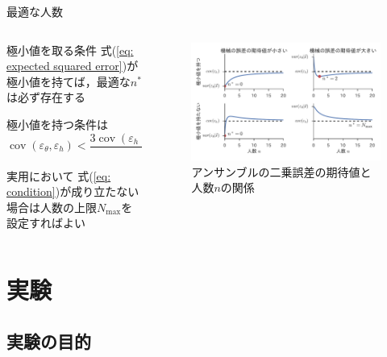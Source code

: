 \documentclass[dvipdfmx,aspectratio=169]{beamer}
\DeclareMathOperator{\var}{var}
\DeclareMathOperator{\cov}{cov}
\newcommand{\varh}{\var(\varepsilon_h)}
\newcommand{\covh}{\cov(\varepsilon_h)}
\newcommand{\covmh}{\cov(\varepsilon_\theta, \varepsilon_h)}
\begin{document}
\begin{frame}{最適な人数}
\begin{columns}
  \begin{column}{0.4\textwidth}
    \begin{alertblock}{極小値を取る条件}
      式(\ref{eq: expected squared error})が極小値を持てば，最適な$n^\ast$は必ず存在する

      極小値を持つ条件は
      \begin{equation}
        \covmh < \frac{3\covh - \varh}{2}
        \label{eq: condition}
      \end{equation}
    \end{alertblock}
    \begin{block}{実用において}
      式(\ref{eq: condition})が成り立たない場合は人数の上限$N_{\text{max}}$を設定すればよい
    \end{block}
  \end{column}
  \begin{column}{0.6\textwidth}
    \begin{figure}
      \centering
      \includegraphics[width=\columnwidth]{slide-ensemble_graph.pdf}
      \caption{アンサンブルの二乗誤差の期待値と人数$n$の関係}
    \end{figure}
  \end{column}
\end{columns}
\end{frame}

\section{実験}

\subsection{実験の目的}
\end{document}
